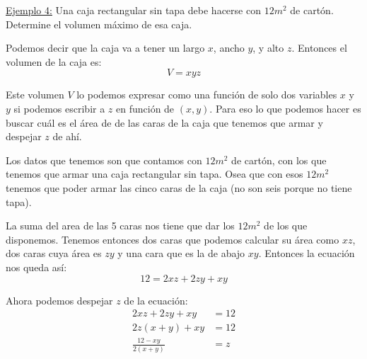 \documentclass[12pt]{article}
\begin{document}
\underline{Ejemplo 4:} Una caja rectangular sin tapa debe hacerse con $ 12 m^2 $ de cartón. Determine el volumen máximo de esa caja.

Podemos decir que la caja va a tener un largo $ x $, ancho $ y $, y alto $ z $. Entonces el volumen de la caja es:
\[
  V=xyz
\]

Este volumen $ V $ lo podemos expresar como una función de solo dos variables $ x $ y $ y $ si podemos escribir a $ z $ en función de $ (x,y) $. Para eso lo que podemos hacer es buscar cuál es el área de de las caras de la caja que tenemos que armar y despejar $ z $ de ahí.

Los datos que tenemos son que contamos con $ 12m^2 $ de cartón, con los que tenemos que armar una caja rectangular sin tapa. Osea que con esos $ 12m^2 $ tenemos que poder armar las cinco caras de la caja (no son seis porque no tiene tapa). 

\begin{center}
\end{center}

La suma del area de las 5 caras nos tiene que dar los $ 12m^2 $ de los que disponemos. Tenemos entonces dos caras que podemos calcular su área como $ xz $, dos caras cuya área es $ zy $ y una cara que es la de abajo $ xy $. Entonces la ecuación nos queda así:
\[
  12 = 2xz + 2zy + xy
\]

Ahora podemos despejar $ z $ de la ecuación:
\begin{align*}
  2xz + 2zy + xy &= 12\\
  2z(x+y)+xy &= 12\\
  \frac{12-xy}{2(x+y)} &= z
\end{align*}
\end{document}
